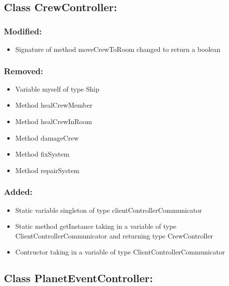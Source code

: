 \documentclass{article}
\begin{document}

\subsection{Class CrewController:}

\subsubsection{Modified:}
\begin{itemize}
\item Signature of method moveCrewToRoom changed to return a boolean
\end{itemize}

\subsubsection{Removed:}
\begin{itemize}
\item Variable myself of type Ship
\item Method healCrewMember
\item Method healCrewInRoom
\item Method damageCrew
\item Method fixSystem
\item Method repairSystem
\end{itemize}

\subsubsection{Added:}
\begin{itemize}
\item Static variable singleton of type clientControllerCommunicator
\item Static method getInstance taking in a variable of type ClientControllerCommunicator and returning type CrewController
\item Contructor taking in a variable of type ClientControllerCommunicator
\end{itemize}


\subsection{Class PlanetEventController:}
\end{document}

